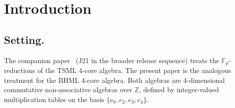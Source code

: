 \documentclass[11pt,reqno]{amsart}
\theoremstyle{plain}
\theoremstyle{definition}
\theoremstyle{remark}
\newcommand{\Z}{\mathbb{Z}}
\newcommand{\F}{\mathbb{F}}
\newcommand{\TSML}{\mathrm{TSML}}
\newcommand{\BHML}{\mathrm{BHML}}
\begin{document}
\begin{abstract}
\smallskip\noindent
\textbf{Scope and tier discipline.} \emph{Proven.} The four
characteristic-independent invariants of $V^{\BHML}_{\F_{p}}$ stated
in Theorem~\ref{thm:universality}; the rank-preservation profile of
Proposition~\ref{prop:rank-honest}; the
$\det(\BHML_{8}^{\circ}) = +70$ integer identity. \emph{Computed.}
Reference Python scripts (\texttt{bhml\_fp\_universality.py} and
\texttt{bhml\_chain\_shells.py}, runtime $< 30$\,s combined) verify
all numerical claims by sympy/numpy linear algebra. \emph{Structural
rhyme.} The skeleton invariants resemble those of the parallel
$V^{\TSML}_{\F_{p}}$ algebra studied in companion
work~\cite{SandersGishFpTSML}; the resemblance reflects the shared
near-absorber structure on $e_{0}$ but the two algebras are not
isomorphic. \emph{Open.} Whether $\det(\BHML_{8}^{\circ}) =
\binom{8}{4}$ admits a Lindström--Gessel--Viennot or
Cauchy--Binet-style structural derivation, or is a small-integer
coincidence; a structural classification of the idempotent count as
a function of $p$.
\end{abstract}

\maketitle

\tableofcontents

\section{Introduction}
\label{sec:intro}

\subsection{Setting.}
The companion paper~\cite{SandersGishFpTSML} (J21 in the broader
release sequence) treats the $\F_{p}$-reductions of the
$\TSML$ 4-core algebra. The present paper is the analogous
treatment for the $\BHML$ 4-core algebra. Both algebras are
$4$-dimensional commutative non-associative algebras over $\Z$,
defined by integer-valued multiplication tables on the basis
$\{e_{0}, e_{2}, e_{3}, e_{4}\}$.
\end{document}
